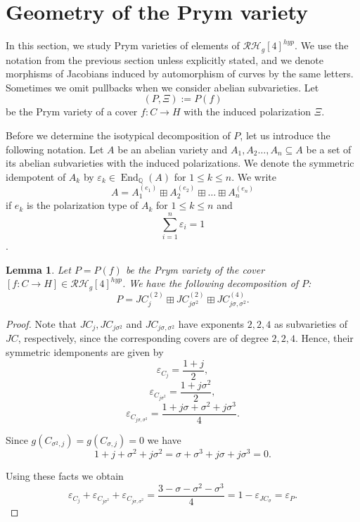 \documentclass{article}
\newtheorem{lem}[thm]{Lemma}
\numberwithin{equation}{section}
\DeclareMathOperator{\End}{End}
\begin{document}
\section{Geometry of the Prym variety}
\label{sec3}

In this section, we study Prym varieties of elements of $\mathcal{RH}_g[4]^{hyp}$. We use the notation from the previous section unless explicitly stated, and we denote morphisms of Jacobians induced by automorphism of curves by the same letters. Sometimes we omit pullbacks when we consider abelian subvarieties. 
Let $$(P, \Xi) := P(f)$$ be the Prym variety of a cover $f: C \to H$ with the induced polarization $\Xi$. 

Before we determine the isotypical decomposition of $P$, let us introduce the following notation. Let $A$ be an abelian variety and $A_1, A_2 \ldots, A_n \subseteq A$ be a set of its abelian subvarieties with the induced polarizations. We denote the symmetric idempotent of $A_k$ by $\varepsilon_{k} \in \End_{\mathbb{Q}}(A)$ for $1 \leq k \leq n$. We write $$A = A_1^{(e_1)} \boxplus A_2^{(e_2)} \boxplus \ldots \boxplus A_n^{(e_n)}$$ if $e_k$ is the polarization type of \(A_k\) for $1 \leq k \leq n$ and $$\sum_{i=1}^n \varepsilon_i = 1$$. 

\begin{lem}
\label{isotypical}
Let $P = P(f)$ be the Prym variety of the cover $[f:C \to H] \in \mathcal{RH}_g[4]^{hyp}$. We have the following decomposition of $P$:
    $$P = JC_j^{(2)} \boxplus JC_{j\sigma^2}^{(2)} \boxplus JC_{j\sigma, \sigma^2}^{(4)}.$$ 
\end{lem}

\begin{proof}
    Note that $JC_j, JC_{j\sigma^2}$ and $JC_{j\sigma, \sigma^2}$ have exponents $2,2,4$ as subvarieties of $JC$, respectively, since the corresponding covers are of degree $2,2,4$. Hence, their symmetric idemponents are given by
$$\varepsilon_{C_j} = \frac{1 + j}{2},$$
$$\varepsilon_{C_{j\sigma^2}} = \frac{1 + j\sigma^2}{2},$$
$$\varepsilon_{C_{j\sigma,\sigma^2}} = \frac{1 + j\sigma + \sigma^2 + j\sigma^3}{4}.$$

Since $g(C_{\sigma^2, j}) = g(C_{\sigma, j}) =  0$ we have $$1 + j + \sigma^2 + j\sigma^2 = \sigma + \sigma^3 + j\sigma + j\sigma^3 = 0.$$

Using these facts we obtain $$\varepsilon_{C_j} + \varepsilon_{C_{j\sigma^2}} + \varepsilon_{C_{j\sigma,\sigma^2}} = \frac{3 - \sigma - \sigma^2 - \sigma^3}{4} = 1 - \varepsilon_{JC_{\sigma}} = \varepsilon_P.$$
\end{proof}
\end{document}
